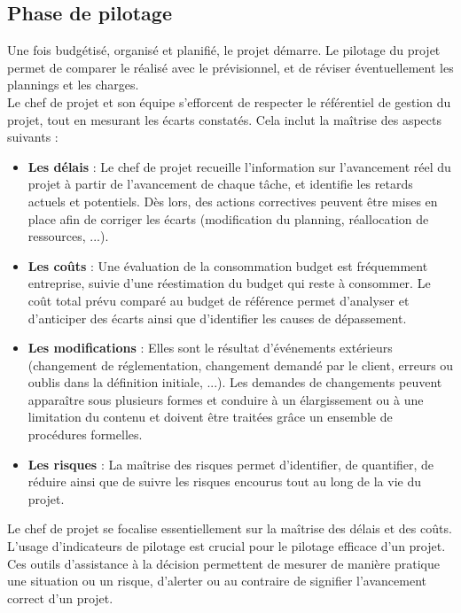 \begin{spacing}{1.5}
\subsection{Phase de pilotage}
Une fois budgétisé, organisé et planifié, le projet démarre. Le pilotage du projet permet de comparer le réalisé avec le prévisionnel, et de réviser éventuellement les plannings et les charges.\\
Le chef de projet et son équipe s'efforcent de respecter le référentiel de gestion du projet, tout en mesurant les écarts constatés. Cela inclut la maîtrise des aspects suivants :
\begin{itemize}
    \item \textbf{Les délais} : Le chef de projet recueille l'information sur l'avancement réel du projet à partir de l'avancement de chaque tâche, et identifie les retards actuels et potentiels. Dès lors, des actions correctives peuvent être mises en place afin de corriger les écarts (modification du planning, réallocation de ressources, ...).
    \item \textbf{Les coûts} : Une évaluation de la consommation budget est fréquemment entreprise, suivie d'une réestimation du budget qui reste à consommer. Le coût total prévu comparé au budget de référence permet d'analyser et d'anticiper des écarts ainsi que d'identifier les causes de dépassement.
    \item \textbf{Les modifications} : Elles sont le résultat d'événements extérieurs (changement de réglementation, changement demandé par le client, erreurs ou oublis dans la définition initiale, ...). Les demandes de changements peuvent apparaître sous plusieurs formes et conduire à un élargissement ou à une limitation du contenu et doivent être traitées grâce un ensemble de procédures formelles.
    \item \textbf{Les risques} : La maîtrise des risques permet d'identifier, de quantifier, de réduire ainsi que de suivre les risques encourus tout au long de la vie du projet.
\end{itemize}
Le chef de projet se focalise essentiellement sur la maîtrise des délais et des coûts.\\

L'usage d’indicateurs de pilotage est crucial pour le pilotage efficace d'un projet. Ces outils d'assistance à la décision permettent de mesurer de manière pratique une situation ou un risque, d'alerter ou au contraire de signifier l'avancement correct d'un projet.



\end{spacing}
